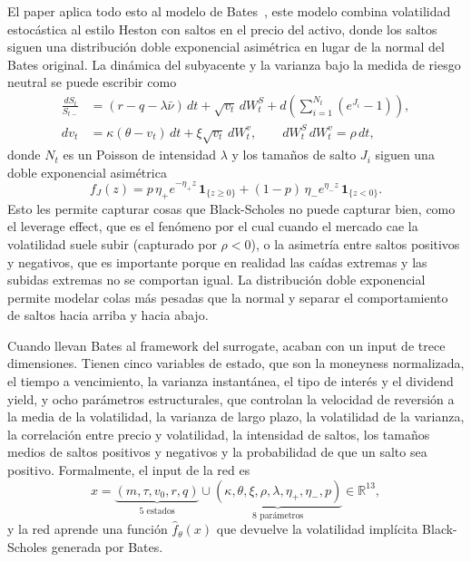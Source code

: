 \documentclass[11pt,a4paper]{article}
\begin{document}
El paper aplica todo esto al modelo de Bates~\cite{bates1996}, este modelo combina volatilidad estocástica al estilo Heston con saltos en el precio del activo, donde los saltos siguen una distribución doble exponencial asimétrica en lugar de la normal del Bates original. La dinámica del subyacente y la varianza bajo la medida de riesgo neutral se puede escribir como
\begin{align}
\frac{dS_t}{S_{t-}} &= (r - q - \lambda \bar{\nu})\, dt + \sqrt{v_t}\, dW^S_t + d\!\left(\sum_{i=1}^{N_t}(e^{J_i} - 1)\right), \\
dv_t &= \kappa(\theta - v_t)\, dt + \xi \sqrt{v_t}\, dW^v_t, \qquad dW^S_t\, dW^v_t = \rho\, dt,
\end{align}
donde $N_t$ es un Poisson de intensidad $\lambda$ y los tamaños de salto $J_i$ siguen una doble exponencial asimétrica
\begin{equation}
f_J(z) = p\, \eta_+ e^{-\eta_+ z}\, \mathbf{1}_{\{z\geq 0\}} + (1-p)\, \eta_- e^{\eta_- z}\, \mathbf{1}_{\{z<0\}}.
\end{equation}
Esto les permite capturar cosas que Black-Scholes no puede capturar bien, como el leverage effect, que es el fenómeno por el cual cuando el mercado cae la volatilidad suele subir (capturado por $\rho < 0$), o la asimetría entre saltos positivos y negativos, que es importante porque en realidad las caídas extremas y las subidas extremas no se comportan igual. La distribución doble exponencial permite modelar colas más pesadas que la normal y separar el comportamiento de saltos hacia arriba y hacia abajo.

Cuando llevan Bates al framework del surrogate, acaban con un input de trece dimensiones. Tienen cinco variables de estado, que son la moneyness normalizada, el tiempo a vencimiento, la varianza instantánea, el tipo de interés y el dividend yield, y ocho parámetros estructurales, que controlan la velocidad de reversión a la media de la volatilidad, la varianza de largo plazo, la volatilidad de la varianza, la correlación entre precio y volatilidad, la intensidad de saltos, los tamaños medios de saltos positivos y negativos y la probabilidad de que un salto sea positivo. Formalmente, el input de la red es
\begin{equation}
x = \underbrace{(m, \tau, v_0, r, q)}_{\text{5 estados}} \cup \underbrace{(\kappa, \theta, \xi, \rho, \lambda, \eta_+, \eta_-, p)}_{\text{8 parámetros}} \in \mathbb{R}^{13},
\end{equation}
y la red aprende una función $\hat{f}_\theta(x)$ que devuelve la volatilidad implícita Black-Scholes generada por Bates.
\end{document}
